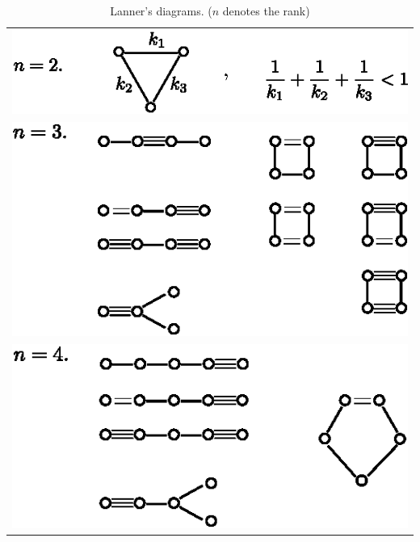 \pageoriginale
{
\renewcommand{\arraystretch}{1.5}
\tabcolsep=10pt
\begin{longtable}{@{}l@{}}
\caption{Lanner's diagrams. ($n$ denotes the rank)}\label{art10-table-3}\\
 {\includegraphics{345b.eps}}\\
 {\includegraphics{345c.eps}}\\
{\includegraphics{345d.eps}}
\end{longtable}}\relax

\pageoriginale


